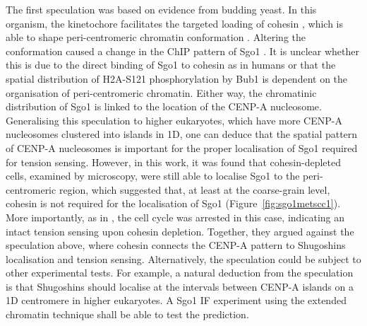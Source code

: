The first speculation was based on evidence from budding yeast. In this organism, the kinetochore facilitates the targeted loading of cohesin \citep{Hinshaw2015StructuralLoading, Hinshaw2017TheComplex, Fernius2009EstablishmentCsm3, Fernius2013Cohesin-DependentEstablishment, Natsume2013KinetochoresRecruitment}, which is able to shape peri-centromeric chromatin conformation \citep{Paldi2020ConvergentPericentromeres}. Altering the conformation caused a change in the ChIP pattern of Sgo1 \citep{Paldi2020ConvergentPericentromeres}. It is unclear whether this is due to the direct binding of Sgo1 to cohesin as in humans \citep{Liu2013, Hara2014, Garcia-Nieto2023StructuralProtection} or that the spatial distribution of H2A-S121 phosphorylation by Bub1 is dependent on the organisation of peri-centromeric chromatin. Either way, the chromatinic distribution of Sgo1 is linked to the location of the CENP-A nucleosome. Generalising this speculation to higher eukaryotes, which have more CENP-A nucleosomes clustered into islands in 1D, one can deduce that the spatial pattern of CENP-A nucleosomes is important for the proper localisation of Sgo1 required for tension sensing. However, in this work, it was found that cohesin-depleted cells, examined by microscopy, were still able to localise Sgo1 to the peri-centromeric region, which suggested that, at least at the coarse-grain level, cohesin is not required for the localisation of Sgo1 (Figure~\ref{fig:sgo1metscc1}). More importantly, as in \cite{Indjeian2005a}, the cell cycle was arrested in this case, indicating an intact tension sensing upon cohesin depletion. Together, they argued against the speculation above, where cohesin connects the CENP-A pattern to Shugoshins localisation and tension sensing. Alternatively, the speculation could be subject to other experimental tests. For example, a natural deduction from the speculation is that Shugoshins should localise at the intervals between CENP-A islands on a 1D centromere in higher eukaryotes. A Sgo1 IF experiment using the extended chromatin technique \citep{Blower2002ConservedHumans, Dunleavy2011H3.3Phase., Kyriacou2018} shall be able to test the prediction. 

